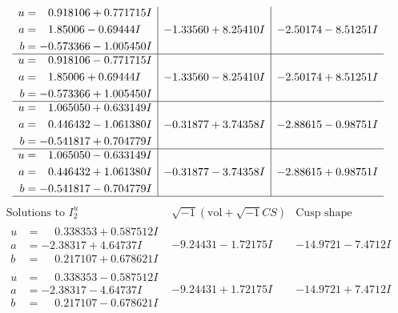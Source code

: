 \documentclass[1p]{elsarticle_modified}
\theoremstyle{definition}
\newcommand{\I}{\sqrt{-1}}
\begin{document}
$$\begin{array}{c|c|c}
\begin{aligned}
u &= \phantom{-}0.918106 + 0.771715 I \\
a &= \phantom{-}1.85006 - 0.69444 I \\
b &= -0.573366 - 1.005450 I\end{aligned}
 & -1.33560 + 8.25410 I & -2.50174 - 8.51251 I \\ \hline\begin{aligned}
u &= \phantom{-}0.918106 - 0.771715 I \\
a &= \phantom{-}1.85006 + 0.69444 I \\
b &= -0.573366 + 1.005450 I\end{aligned}
 & -1.33560 - 8.25410 I & -2.50174 + 8.51251 I \\ \hline\begin{aligned}
u &= \phantom{-}1.065050 + 0.633149 I \\
a &= \phantom{-}0.446432 - 1.061380 I \\
b &= -0.541817 + 0.704779 I\end{aligned}
 & -0.31877 + 3.74358 I & -2.88615 - 0.98751 I \\ \hline\begin{aligned}
u &= \phantom{-}1.065050 - 0.633149 I \\
a &= \phantom{-}0.446432 + 1.061380 I \\
b &= -0.541817 - 0.704779 I\end{aligned}
 & -0.31877 - 3.74358 I & -2.88615 + 0.98751 I\\
 \hline 
 \end{array}$$\newpage$$\begin{array}{c|c|c}  
\text{Solutions to }I^u_{2}& \I (\text{vol} + \sqrt{-1}CS) & \text{Cusp shape}\\
 \hline 
\begin{aligned}
u &= \phantom{-}0.338353 + 0.587512 I \\
a &= -2.38317 + 4.64737 I \\
b &= \phantom{-}0.217107 + 0.678621 I\end{aligned}
 & -9.24431 - 1.72175 I & -14.9721 - 7.4712 I \\ \hline\begin{aligned}
u &= \phantom{-}0.338353 - 0.587512 I \\
a &= -2.38317 - 4.64737 I \\
b &= \phantom{-}0.217107 - 0.678621 I\end{aligned}
 & -9.24431 + 1.72175 I & -14.9721 + 7.4712 I \\ \hline\begin{aligned}

\end{aligned}
\end{array}$$
\end{document}
